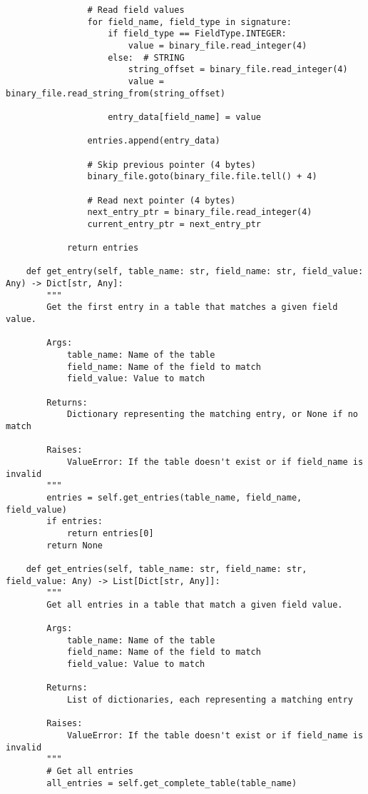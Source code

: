 \documentclass[utf8]{article}
\begin{document}
\begin{verbatim}
                # Read field values
                for field_name, field_type in signature:
                    if field_type == FieldType.INTEGER:
                        value = binary_file.read_integer(4)
                    else:  # STRING
                        string_offset = binary_file.read_integer(4)
                        value = binary_file.read_string_from(string_offset)
                    
                    entry_data[field_name] = value
                
                entries.append(entry_data)
                
                # Skip previous pointer (4 bytes)
                binary_file.goto(binary_file.file.tell() + 4)
                
                # Read next pointer (4 bytes)
                next_entry_ptr = binary_file.read_integer(4)
                current_entry_ptr = next_entry_ptr
            
            return entries
    
    def get_entry(self, table_name: str, field_name: str, field_value: Any) -> Dict[str, Any]:
        """
        Get the first entry in a table that matches a given field value.
        
        Args:
            table_name: Name of the table
            field_name: Name of the field to match
            field_value: Value to match
            
        Returns:
            Dictionary representing the matching entry, or None if no match
            
        Raises:
            ValueError: If the table doesn't exist or if field_name is invalid
        """
        entries = self.get_entries(table_name, field_name, field_value)
        if entries:
            return entries[0]
        return None
    
    def get_entries(self, table_name: str, field_name: str, field_value: Any) -> List[Dict[str, Any]]:
        """
        Get all entries in a table that match a given field value.
        
        Args:
            table_name: Name of the table
            field_name: Name of the field to match
            field_value: Value to match
            
        Returns:
            List of dictionaries, each representing a matching entry
            
        Raises:
            ValueError: If the table doesn't exist or if field_name is invalid
        """
        # Get all entries
        all_entries = self.get_complete_table(table_name)
        

\end{verbatim}
\end{document}
